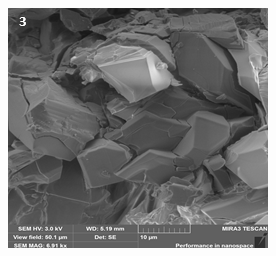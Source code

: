 \begin{figure}[H]
\begin{subfigure}[b]{0.32\textwidth}
    \end{subfigure}
    \begin{subfigure}[b]{0.32\textwidth}
        \centering
        \includegraphics[height=0.9\textwidth]{assets/47}
    \end{subfigure}
\end{figure}

